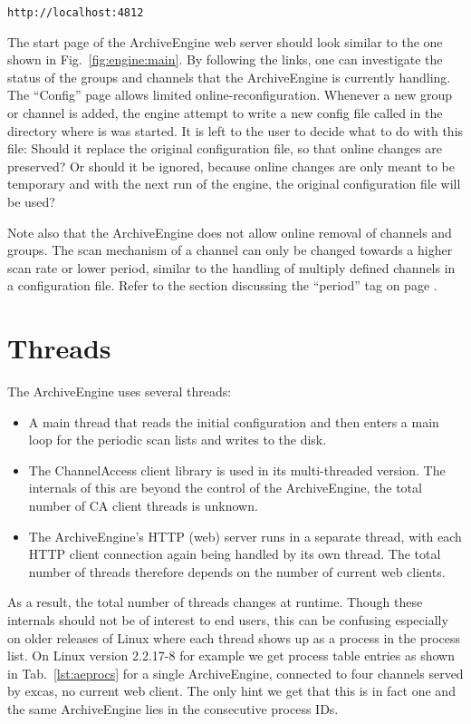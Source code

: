 \begin{lstlisting}[frame=none,keywordstyle=\sffamily]
    http://localhost:4812
\end{lstlisting}

\noindent The start page of the ArchiveEngine web server should look
similar to the one shown in Fig.~\ref{fig:engine:main}. By following
the links, one can investigate the status of the groups and channels
that the ArchiveEngine is currently handling. The ``Config'' page
allows limited online-reconfiguration. Whenever a new group or channel
is added, the engine attempt to write a new config file called
 in the directory where is was started.
It is left to the user to decide what to do with this file: Should it
replace the original configuration file, so that online changes are
preserved? Or should it be ignored, because online changes are only
meant to be temporary and with the next run of the engine, the
original configuration file will be used?

Note also that the ArchiveEngine does not allow online removal of
channels and groups. The scan mechanism of a channel can only be
changed towards a higher scan rate or lower period, similar to the
handling of multiply defined channels in a configuration file. Refer
to the section discussing the ``period'' tag on page \pageref{sec:period}.

\section{Threads} %
The ArchiveEngine uses several threads:
\begin{itemize}
\item A main thread that reads the initial configuration and then
  enters a main loop for the periodic scan lists and writes to the
  disk.
\item The ChannelAccess client library is used in its multi-threaded
  version. The internals of this are beyond the control of the
  ArchiveEngine, the total number of CA client threads is unknown.
\item The ArchiveEngine's HTTP (web) server runs in a separate thread,
  with each HTTP client connection again being handled by its own
  thread. The total number of threads therefore depends on the number
  of current web clients.
\end{itemize}
As a result, the total number of threads changes at runtime. Though
these internals should not be of interest to end users, this can be
confusing especially on older releases of Linux where each thread
shows up as a process in the process list.
On Linux version 2.2.17-8 for example we get process table entries as
shown in Tab.~\ref{lst:aeprocs} for a single ArchiveEngine, connected
to four channels served by excas, no current web client. The only hint
we get that this is in fact one and the same ArchiveEngine lies in the
consecutive process IDs.

